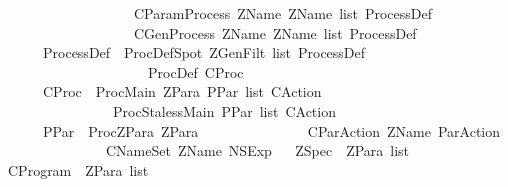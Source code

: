 \begin{isabellebody}
\ \ \ \ \ \ \ \ \ \ \ \ \ \ \ \ \ \ {\isacharbar}\ CParamProcess\ ZName\ {\isachardoublequoteopen}ZName\ list{\isachardoublequoteclose}\ ProcessDef\isanewline
\ \ \ \ \ \ \ \ \ \ \ \ \ \ \ \ \ \ {\isacharbar}\ CGenProcess\ ZName\ {\isachardoublequoteopen}ZName\ list{\isachardoublequoteclose}\ ProcessDef\isanewline
{}\ \ \ \ \ \ ProcessDef\ {\isacharequal}\ ProcDefSpot\ {\isachardoublequoteopen}ZGenFilt\ list{\isachardoublequoteclose}\ ProcessDef\isanewline
\ \ \ \ \ \ \ \ \ \ \ \ \ \ \ \ \ \ \ \ {\isacharbar}\ ProcDef\ CProc\isanewline
{}\ \ \ \ \ \ CProc\ {\isacharequal}\ ProcMain\ ZPara\ {\isachardoublequoteopen}PPar\ list{\isachardoublequoteclose}\ CAction\isanewline
\ \ \ \ \ \ \ \ \ \ \ \ \ \ \ {\isacharbar}\ ProcStalessMain\ {\isachardoublequoteopen}PPar\ list{\isachardoublequoteclose}\ CAction\isanewline
{}\ \ \ \ \ \ PPar\ {\isacharequal}\ ProcZPara\ ZPara\isanewline
\ \ \ \ \ \ \ \ \ \ \ \ \ \ {\isacharbar}\ CParAction\ ZName\ ParAction\isanewline
\ \ \ \ \ \ \ \ \ \ \ \ \ \ {\isacharbar}\ CNameSet\ ZName\ NSExp\isanewline
\ \isanewline
{}\isamarkupfalse%
\ ZSpec\ {\isacharequal}\ {\isachardoublequoteopen}ZPara\ list{\isachardoublequoteclose}\isanewline
\ \isanewline
{}\isamarkupfalse%
\ CProgram\ {\isacharequal}\ {\isachardoublequoteopen}ZPara\ list{\isachardoublequoteclose}\isanewline
%
\isadelimtheory
\isanewline
%
\endisadelimtheory
%
\isatagtheory
{}\isamarkupfalse%
%
\endisatagtheory
{\isafoldtheory}%
%
\isadelimtheory
%
\endisadelimtheory
%
\end{isabellebody}%
